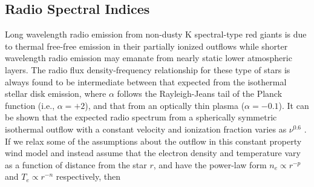 \documentclass[iop]{emulateapj}
\begin{document}
\subsection{Radio Spectral Indices} \label{disc:disc3}
Long wavelength radio emission from non-dusty K spectral-type red giants is due to thermal free-free emission in their partially ionized outflows while shorter wavelength radio emission may emanate from nearly static lower atmospheric layers. The radio flux density-frequency relationship for these type of stars is always found to be intermediate between that expected from the isothermal stellar disk emission, where $\alpha$ follows the Rayleigh-Jeans tail of the Planck function (i.e., $\alpha = +2$), and that from an optically thin plasma ($\alpha = -0.1$). It can be shown that the expected radio spectrum from a spherically symmetric isothermal outflow with a constant velocity and ionization fraction varies as $\nu ^{0.6}$ \citep{1975MNRAS.170...41W,1975AA....39..217O,1975AA....39....1P}. If we relax some of the assumptions about the outflow in this constant property wind model and instead assume that the electron density and temperature vary as a function of distance from the star $r$, and have the power-law form $n_{e} \propto r^{-p}$ and $T_{e} \propto r^{-n}$ respectively, then 
\end{document}

